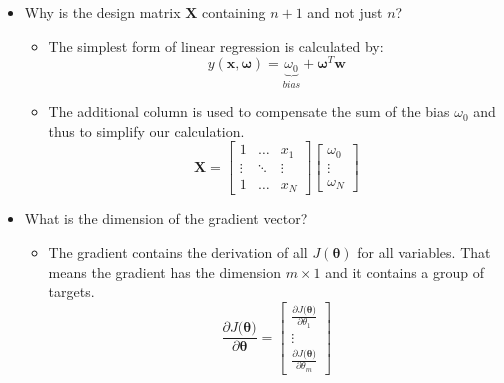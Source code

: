 \documentclass{article}
\begin{document}
\begin{itemize}

    
    \item Why is the design matrix $\boldsymbol{X}$ containing $n + 1$ and not just $n$?
    
    \begin{itemize} 
    
        \item The simplest form of linear regression is calculated by:
            $$y(\boldsymbol{x, \omega}) = \underset{bias}{\underbrace{\omega_0}} + \boldsymbol{\omega}^T \boldsymbol{w}$$
        \item The additional column is used to compensate the sum of the bias $\omega_0$ and thus to simplify our calculation. \\
      
            $$ \boldsymbol{X} = 
            \begin{bmatrix}
	            1		& \dots		& x_1	\\
	            \vdots	& \ddots 	& \vdots		\\
	            1		& \dots 		& x_N
	            \end{bmatrix}
	            \begin{bmatrix}
	            \omega_0 \\
	            \vdots	 \\
	            \omega_N	 
            \end{bmatrix} $$
     \end{itemize}
    
    \item What is the dimension of the gradient vector?
    
    \begin{itemize}
        \item The gradient contains the derivation of all $J\boldsymbol{(\theta)}$ for all variables. That means the gradient has the dimension $m \times 1$ and it contains a group of targets. \\        
            $$\frac{\partial J(\boldsymbol{\boldsymbol{\theta)}}}{\partial \boldsymbol{\theta}} =
            \begin{bmatrix}
            	\frac{\partial J(\boldsymbol{\theta)}}{\partial \theta_1}	 \\
            	\vdots \\
            	\frac{\partial J(\boldsymbol{\theta)}}{\partial \theta_m}  	
            \end{bmatrix}$$     
    \end{itemize} 
    

\end{itemize}
\end{document}
